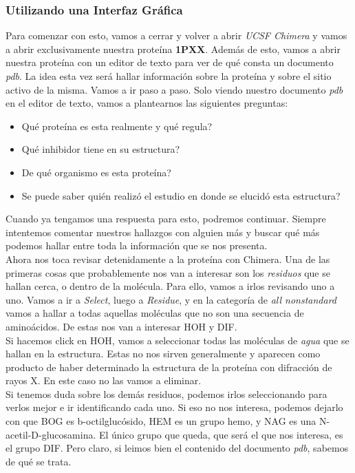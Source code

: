 \documentclass[10pt,letterpaper]{article}
\begin{document}
\subsubsection{Utilizando una Interfaz Gr\'afica}

Para comenzar con esto, vamos a cerrar y volver a abrir \textit{UCSF Chimera} y vamos a abrir exclusivamente nuestra prote\'ina \textbf{1PXX}. Adem\'as de esto, vamos a abrir nuestra prote\'ina con un editor de texto para ver de qu\'e consta un documento \emph{pdb}. La idea esta vez ser\'a hallar informaci\'on sobre la prote\'ina y sobre el sitio activo de la misma. Vamos a ir paso a paso. Solo viendo nuestro documento \emph{pdb} en el editor de texto, vamos a plantearnos las siguientes preguntas:

\begin{itemize}
\item Qu\'e prote\'ina es esta realmente y qu\'e regula?
\item Qu\'e inhibidor tiene en su estructura?
\item De qu\'e organismo es esta prote\'ina?
\item Se puede saber qui\'en realiz\'o el estudio en donde se elucid\'o esta estructura?
\end{itemize}

Cuando ya tengamos una respuesta para esto, podremos continuar. Siempre intentemos comentar nuestros hallazgos con alguien m\'as y buscar qu\'e m\'as podemos hallar entre toda la informaci\'on que se nos presenta.\\

Ahora nos toca revisar detenidamente a la prote\'ina con Chimera. Una de las primeras cosas que probablemente nos van a interesar son los \emph{residuos} que se hallan cerca, o dentro de la mol\'ecula. Para ello, vamos a irlos revisando uno a uno. Vamos a ir a \emph{Select}, luego a \emph{Residue}, y en la categor\'ia de \emph{all nonstandard} vamos a hallar a todas aquellas mol\'eculas que no son una secuencia de amino\'acidos. De estas nos van a interesar HOH y DIF.\\

Si hacemos click en HOH, vamos a seleccionar todas las mol\'eculas de \emph{agua} que se hallan en la estructura. Estas no nos sirven generalmente y aparecen como producto de haber determinado la estructura de la prote\'ina con difracci\'on de rayos X. En este caso no las vamos a eliminar.\\

Si tenemos duda sobre los dem\'as residuos, podemos irlos seleccionando para verlos mejor e ir identificando cada uno. Si eso no nos interesa, podemos dejarlo con que BOG es b-octilgluc\'osido, HEM es un grupo hemo, y NAG es una N-acetil-D-glucosamina. El \'unico grupo que queda, que ser\'a el que nos interesa, es el grupo DIF. Pero claro, si leimos bien el contenido del documento \emph{pdb}, sabemos de qu\'e se trata.\\
\end{document}
